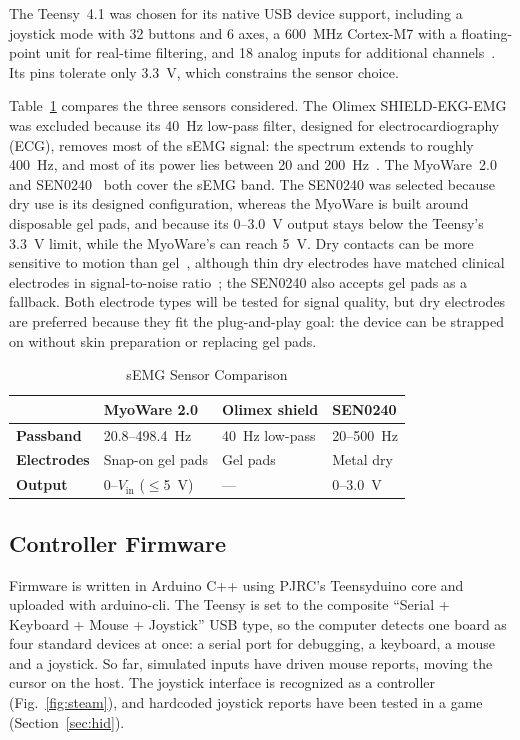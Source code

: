 \documentclass[conference]{IEEEtran}
\begin{document}
The Teensy~4.1 was chosen for its native USB device support, including a joystick mode with 32 buttons and 6 axes, a 600~MHz Cortex-M7 with a floating-point unit for real-time filtering, and 18 analog inputs for additional channels~\cite{teensy}. Its pins tolerate only 3.3~V, which constrains the sensor choice.

Table~\ref{tab:sensors} compares the three sensors considered. The Olimex SHIELD-EKG-EMG was excluded because its 40~Hz low-pass filter, designed for electrocardiography (ECG), removes most of the sEMG signal: the spectrum extends to roughly 400~Hz, and most of its power lies between 20 and 200~Hz~\cite{deluca}. The MyoWare~2.0~\cite{myoware} and SEN0240~\cite{sen0240} both cover the sEMG band. The SEN0240 was selected because dry use is its designed configuration, whereas the MyoWare is built around disposable gel pads, and because its 0--3.0~V output stays below the Teensy's 3.3~V limit, while the MyoWare's can reach 5~V. Dry contacts can be more sensitive to motion than gel~\cite{li2020}, although thin dry electrodes have matched clinical electrodes in signal-to-noise ratio~\cite{yamagami2018}; the SEN0240 also accepts gel pads as a fallback. Both electrode types will be tested for signal quality, but dry electrodes are preferred because they fit the plug-and-play goal: the device can be strapped on without skin preparation or replacing gel pads.

\begin{table}[!t]
\caption{sEMG Sensor Comparison}
\label{tab:sensors}
\centering
\footnotesize
\setlength{\tabcolsep}{4pt}
\renewcommand{\arraystretch}{1.15}
\begin{tabular}{@{}llll@{}}
\toprule
 & \textbf{MyoWare 2.0} & \textbf{Olimex shield} & \textbf{SEN0240} \\
\midrule
\textbf{Passband} & 20.8--498.4~Hz & 40~Hz low-pass & 20--500~Hz \\
\textbf{Electrodes} & Snap-on gel pads & Gel pads & Metal dry \\
\textbf{Output} & 0--$V_\mathrm{in}$ ($\leq$5~V) & --- & 0--3.0~V \\
\bottomrule
\end{tabular}
\end{table}

\subsection{Controller Firmware}

Firmware is written in Arduino C++ using PJRC's Teensyduino core and uploaded with arduino-cli. The Teensy is set to the composite ``Serial + Keyboard + Mouse + Joystick'' USB type, so the computer detects one board as four standard devices at once: a serial port for debugging, a keyboard, a mouse and a joystick. So far, simulated inputs have driven mouse reports, moving the cursor on the host. The joystick interface is recognized as a controller (Fig.~\ref{fig:steam}), and hardcoded joystick reports have been tested in a game (Section~\ref{sec:hid}).
\end{document}
